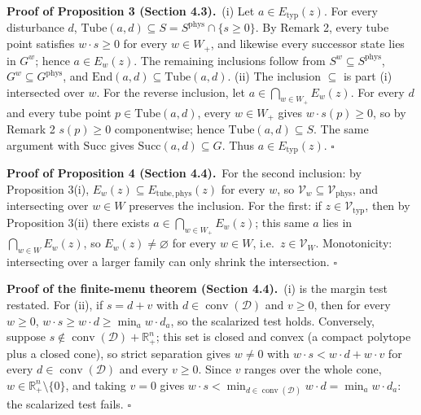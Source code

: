 \documentclass[3p,11pt]{elsarticle}
\begin{document}
\textbf{Proof of Proposition 3 (Section 4.3).}\ (i) Let \(a \in E_{\mathrm{typ}}(z)\). For every
disturbance \(d\),
\(\mathrm{Tube}(a,d) \subseteq S = S^{\mathrm{phys}} \cap \{s \ge 0\}\).
By Remark 2, every tube point satisfies \(w \cdot s \ge 0\) for every
\(w \in W_+\), and likewise every successor state lies in \(G^w\); hence
\(a \in E_w(z)\). The remaining inclusions follow from
\(S^w \subseteq S^{\mathrm{phys}}\),
\(G^w \subseteq G^{\mathrm{phys}}\), and
\(\mathrm{End}(a,d) \subseteq \mathrm{Tube}(a,d)\). (ii) The inclusion
\(\subseteq\) is part (i) intersected over \(w\). For the reverse
inclusion, let \(a \in \bigcap_{w \in W_+} E_w(z)\). For every \(d\) and
every tube point \(p \in \mathrm{Tube}(a,d)\), every \(w \in W_+\) gives
\(w \cdot s(p) \ge 0\), so by Remark 2 \(s(p) \ge 0\) componentwise;
hence \(\mathrm{Tube}(a,d) \subseteq S\). The same argument with
\(\mathrm{Succ}\) gives \(\mathrm{Succ}(a,d) \subseteq G\). Thus
\(a \in E_{\mathrm{typ}}(z)\). \ensuremath{\square}

\textbf{Proof of Proposition 4 (Section 4.4).}\ For the second inclusion: by Proposition 3(i),
\(E_w(z) \subseteq E_{\mathrm{tube,phys}}(z)\) for every \(w\), so
\(\mathcal{V}_w \subseteq \mathcal{V}_{\mathrm{phys}}\), and
intersecting over \(w \in W\) preserves the inclusion. For the first: if
\(z \in \mathcal{V}_{\mathrm{typ}}\), then by Proposition 3(ii) there
exists \(a \in \bigcap_{w \in W_+} E_w(z)\); this same \(a\) lies in
\(\bigcap_{w \in W} E_w(z)\), so \(E_w(z) \neq \varnothing\) for every
\(w \in W\), i.e.~\(z \in \mathcal{V}_W\). Monotonicity: intersecting
over a larger family can only shrink the intersection. \ensuremath{\square}

\textbf{Proof of the finite-menu theorem (Section 4.4).}\ (i) is the margin test restated. For (ii), if
\(s = d + v\) with \(d \in \operatorname{conv}(\mathcal{D})\) and \(v \ge 0\), then
for every \(w \ge 0\), \(w \cdot s \ge w \cdot d \ge \min_a w \cdot d_a\),
so the scalarized test holds. Conversely, suppose
\(s \notin \operatorname{conv}(\mathcal{D}) + \mathbb{R}^n_+\); this set is closed
and convex (a compact polytope plus a closed cone), so strict separation
gives \(w \ne 0\) with \(w \cdot s < w \cdot d + w \cdot v\) for every
\(d \in \operatorname{conv}(\mathcal{D})\) and every \(v \ge 0\). Since \(v\)
ranges over the whole cone, \(w \in \mathbb{R}^n_+ \setminus \{0\}\), and
taking \(v = 0\) gives
\(w \cdot s < \min_{d \in \operatorname{conv}(\mathcal{D})} w \cdot d =
\min_a w \cdot d_a\): the scalarized test fails. \ensuremath{\square}
\end{document}
